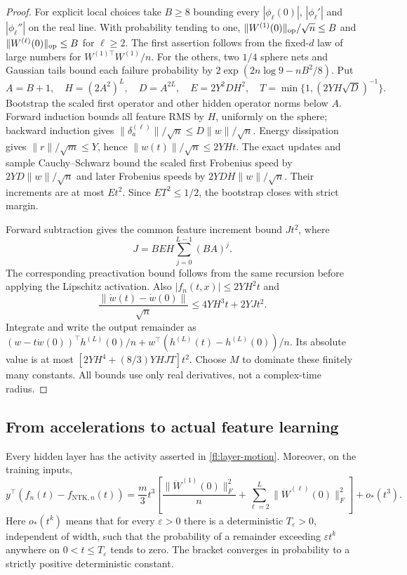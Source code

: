 \begin{proof}
For explicit local choices take $B\ge8$ bounding every
$|\phi_\ell(0)|$, $|\phi_\ell'|$ and $|\phi_\ell''|$ on the real line.
With probability tending to one,
$\|W^{(1)}(0)\|_{\rm op}/\sqrt n\le B$ and
$\|W^{(\ell)}(0)\|_{\rm op}\le B$ for $\ell\ge2$.
The first assertion follows from the fixed-$d$ law of large numbers for
$W^{(1)\top}W^{(1)}/n$. For the others, two $1/4$ sphere nets and Gaussian
tails bound each failure probability by
$2\exp(2n\log9-nB^2/8)$.
Put
\[
 A=B+1,\quad H=(2A^2)^L,\quad D=A^{2L},\quad
 E=2Y^2DH^2,\quad T=\min\{1,(2YH\sqrt D)^{-1}\}.
\]
Bootstrap the scaled first operator and other hidden operator norms below
$A$. Forward induction bounds all feature RMS by $H$, uniformly on the
sphere; backward induction gives
$\|\delta_a^{(\ell)}\|/\sqrt n\le D\|w\|/\sqrt n$.
Energy dissipation gives $\|r\|/\sqrt m\le Y$, hence
$\|w(t)\|/\sqrt n\le2YHt$.
The exact updates and sample Cauchy--Schwarz bound the scaled first
Frobenius speed by $2YD\|w\|/\sqrt n$ and later Frobenius speeds by
$2YDH\|w\|/\sqrt n$. Their increments are at most $Et^2$.
Since $ET^2\le1/2$, the bootstrap closes with strict margin.

Forward subtraction gives the common feature increment bound $Jt^2$, where
\[
 J=BEH\sum_{j=0}^{L-1}(BA)^j.
\]
The corresponding preactivation bound
follows from the same recursion before applying the Lipschitz activation.
Also $|f_n(t,x)|\le2YH^2t$ and
\[
 \frac{\|\dot w(t)-\dot w(0)\|}{\sqrt n}
 \le4YH^3t+2YJt^2.
\]
Integrate and write the output remainder as
$(w-t\dot w(0))^\top h^{(L)}(0)/n
 +w^\top(h^{(L)}(t)-h^{(L)}(0))/n$.
Its absolute value is at most
$[2YH^4+(8/3)YHJT]t^2$.
Choose $M$ to dominate these finitely many constants. All bounds use only
real derivatives, not a complex-time radius.
\end{proof}



\subsection{From accelerations to actual feature learning}

\begin{lemma}
\label{fl:strong-time}
Every hidden layer has the activity asserted in
\eqref{fl:layer-motion}. Moreover, on the training inputs,
\begin{equation}
 y^\top(f_n(t)-f_{\mathrm{NTK},n}(t))
 =\frac m3 t^3\left[
 \frac{\|\ddot W^{(1)}(0)\|_F^2}{n}
 +\sum_{\ell=2}^L\|\ddot W^{(\ell)}(0)\|_F^2\right]+o_*(t^3).
 \label{fl:cubic-identity}
\end{equation}
Here $o_*(t^k)$ means that for every $\varepsilon>0$ there is a
deterministic $T_\varepsilon>0$, independent of width, such that the
probability of a remainder exceeding $\varepsilon t^k$ anywhere on
$0<t\le T_\varepsilon$ tends to zero. The bracket converges in probability
to a strictly positive deterministic constant.
\end{lemma}

